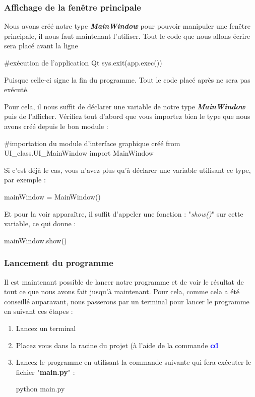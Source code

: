 \documentclass[12pt]{report}    %
\newcommand{\bold}[1]{{\bfseries #1}}
\newcommand{\italic}[1]{{\itshape #1}}
\newcommand{\ib}[1]{{\bfseries\itshape #1}}
\newcommand{\smallSkip}{\vskip 0.5cm}
\begin{document}
\subsubsection{Affichage de la fenêtre principale}

Nous avons créé notre type \ib{MainWindow} pour pouvoir manipuler une fenêtre principale, il nous faut maintenant l'utiliser.\newline
Tout le code que nous allons écrire sera placé avant la ligne
\begin{pyCode}
    #exécution de l'application Qt
	sys.exit(app.exec())
\end{pyCode}
Puisque celle-ci signe la fin du programme. Tout le code placé après ne sera pas exécuté.\smallSkip

Pour cela, il nous suffit de déclarer une variable de notre type \ib{MainWindow} puis de l'afficher.\newline
Vérifiez tout d'abord que vous importez bien le type que nous avons créé depuis le bon module :
\begin{pyCode}
#importation du module d'interface graphique créé
from UI_class.UI_MainWindow import MainWindow
\end{pyCode}
Si c'est déjà le cas, vous n'avez plus qu'à déclarer une variable utilisant ce type, par exemple :
\begin{pyCode}
mainWindow = MainWindow()
\end{pyCode}
Et pour la voir apparaître, il suffit d'appeler une fonction : "\italic{show()}" sur cette variable, ce qui donne :
\begin{pyCode}
mainWindow.show()
\end{pyCode}
\smallSkip


\subsubsection{Lancement du programme}
\label{tag-startProgFromCmdLine}
Il est maintenant possible de lancer notre programme et de voir le résultat de tout ce que nous avons fait jusqu'à maintenant.\newline
Pour cela, comme cela a été conseillé auparavant, nous passerons par un terminal pour lancer le programme en suivant ces étapes :
\begin{enumerate}
\item Lancez un terminal
    
\item Placez vous dans la racine du projet (à l'aide de la commande \textcolor{blue}{\bold{cd}}
    
\item Lancez le programme en utilisant la commande suivante qui fera exécuter le fichier "\bold{main.py}" :
\begin{pyCode}
    python main.py
\end{pyCode}
\end{enumerate}
\end{document}
